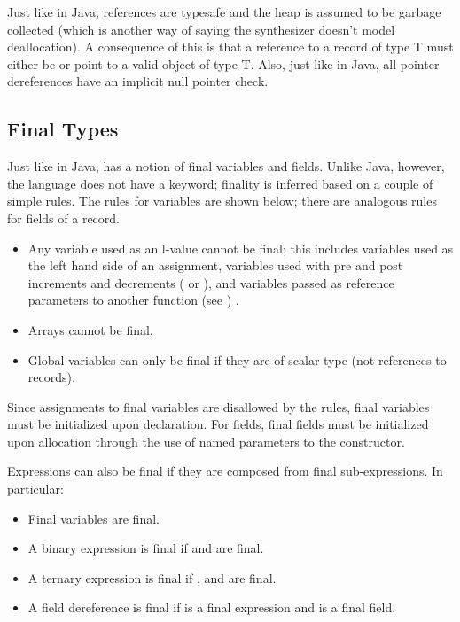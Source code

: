 Just like in Java, references are typesafe and the heap is assumed to be garbage collected (which is another way of saying the synthesizer doesn't model deallocation). A consequence of this is that a reference to a record of type T must either be  or point to a valid object of type T. Also, just like in Java, all pointer dereferences have an implicit null pointer check.

\subsection{Final Types}
Just like in Java, \Sk{} has a notion of final variables and fields. Unlike Java, however, the language does not have a  keyword; finality is inferred based on a couple of simple rules. The rules for variables are shown below; there are analogous rules for fields of a record. 

\begin{itemize}
\item Any variable used as an l-value cannot be final; this includes variables used as the left hand side of an assignment, variables used with pre and post increments and decrements ( or ), and variables passed as reference parameters to another function (see ) .
\item Arrays cannot be final. 
\item Global variables can only be final if they are of scalar type (not references to records).
\end{itemize}

Since assignments to final variables are disallowed by the rules, final variables must be initialized upon declaration. For fields, final fields must be initialized upon allocation through the use of named parameters to the constructor.

Expressions can also be final if they are composed from final sub-expressions. In particular:

\begin{itemize}
\item Final variables are final.
\item A binary expression  is final if  and  are final.
\item A ternary expression  is final if , and  are final.
\item A field dereference  is final if  is a final expression and  is a final field.
\end{itemize}

